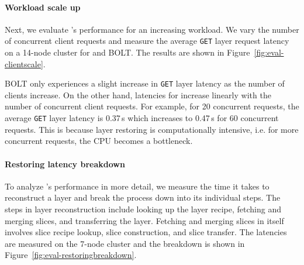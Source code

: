 \paragraph{Workload scale up}
%
Next, we evaluate \sysname{}'s performance for an increasing workload.
%
We vary the number of concurrent client requests and measure the average \texttt{GET} layer
request latency on a 14-node cluster for \sysname and BOLT.
%
The results are shown in Figure~\ref{fig:eval-clientscale}.

BOLT only experiences a slight increase in \texttt{GET} layer latency as the number of clients increase.
%
On the other hand, latencies for \sysname increase linearly with the number of concurrent client requests.
%
For example, for 20 concurrent requests, the average \texttt{GET} layer latency is 0.37\,s which
increases to 0.47\,s for 60 concurrent requests.
%
This is because layer restoring is computationally intensive, i.e. for more concurrent requests, the CPU
becomes a bottleneck.

\paragraph{Restoring latency breakdown}
%
To analyze \sysname{}'s performance in more detail, we measure the time it takes
to reconstruct a layer and break the process down into its individual steps.
%
The steps in layer reconstruction include looking up the layer recipe, fetching and merging 
slices, and transferring the layer. Fetching and merging slices in itself involves slice recipe 
lookup, slice construction, and slice transfer.
%
%
%
%
%
The latencies are measured on the 7-node cluster and the breakdown is shown in
Figure~\ref{fig:eval-restoringbreakdown}.

